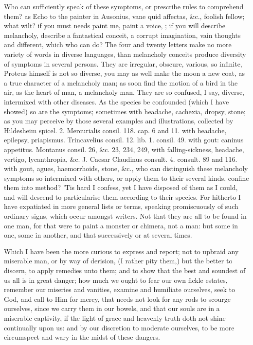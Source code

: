 {Who can sufficiently speak of these symptoms, or prescribe rules to
comprehend them? as Echo to the painter in Ausonius, vane quid
affectas, \&c., foolish fellow; what wilt? if you must needs paint me,
paint a voice, ; if you will
describe melancholy, describe a fantastical conceit, a corrupt
imagination, vain thoughts and different, which who can do? The four
and twenty letters make no more variety of words in diverse languages,
than melancholy conceits produce diversity of symptoms in several
persons. They are irregular, obscure, various, so infinite, Proteus
himself is not so diverse, you may as well make the moon a new coat, as
a true character of a melancholy man; as soon find the motion of a bird
in the air, as the heart of man, a melancholy man. They are so
confused, I say, diverse, intermixed with other diseases. As the
species be confounded (which I have showed) so are the symptoms;
sometimes with headache, cachexia, dropsy, stone; as you may perceive
by those several examples and illustrations, collected by 
Hildesheim spicel. 2. Mercurialis consil. 118. cap. 6 and 11. with
headache, epilepsy, priapismus. Trincavelius consil. 12. lib. 1.
consil. 49. with gout: caninus appetitus. Montanus consil. 26, \&c. 23,
234, 249, with falling-sickness, headache, vertigo, lycanthropia, \&c.
J. Caesar Claudinus consult. 4. consult. 89 and 116. with gout, agues,
haemorrhoids, stone, \&c., who can distinguish these melancholy symptoms
so intermixed with others, or apply them to their several kinds,
confine them into method? 'Tis hard I confess, yet I have disposed of
them as I could, and will descend to particularise them according to
their species. For hitherto I have expatiated in more general lists or
terms, speaking promiscuously of such ordinary signs, which occur
amongst writers. Not that they are all to be found in one man, for that
were to paint a monster or chimera, not a man: but some in one, some in
another, and that successively or at several times.

Which I have been the more curious to express and report; not to
upbraid any miserable man, or by way of derision, (I rather pity them,)
but the better to discern, to apply remedies unto them; and to show
that the best and soundest of us all is in great danger; how much we
ought to fear our own fickle estates, remember our miseries and
vanities, examine and humiliate ourselves, seek to God, and call to Him
for mercy, that needs not look for any rods to scourge ourselves, since
we carry them in our bowels, and that our souls are in a miserable
captivity, if the light of grace and heavenly truth doth not shine
continually upon us: and by our discretion to moderate ourselves, to be
more circumspect and wary in the midst of these dangers.

}

